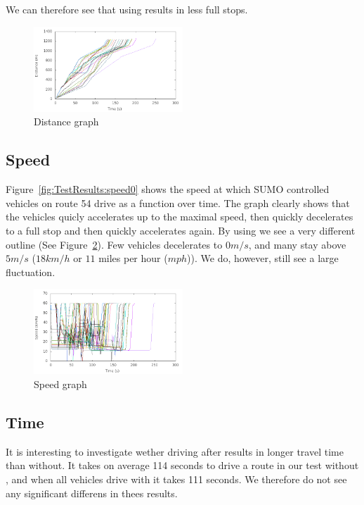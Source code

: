We can therefore see that using \tech results in less full stops.


\begin{figure}[htb]
\includegraphics[width=0.5\textwidth]{images/tp0/distanceControlled100.png}
\caption{Distance graph}
\label{fig:TestResults:distance100}
\end{figure}

\subsection{Speed}
Figure~\ref{fig:TestResults:speed0} shows the speed at which SUMO controlled vehicles on route 54 drive as a function over time.
The graph clearly shows that the vehicles quicly accelerates up to the maximal speed, then quickly decelerates to a full stop and then quickly accelerates again.
By using \tech we see a very different outline (See Figure~\ref{fig:TestResults:speed100}).
Few vehicles decelerates to $0 m/s$, and many stay above $5 m/s$ ($18 km/h$ or $11$ miles per hour ($mph$)).
We do, however, still see a large fluctuation.
\begin{figure}[htb]
\includegraphics[width=0.5\textwidth]{images/tp0/speedControlled100.png}
\caption{Speed graph}
\label{fig:TestResults:speed100}
\end{figure}



\subsection{Time}
It is interesting to investigate wether driving after \tech results in longer travel time than without.
It takes on average 114 seconds to drive a route in our test without \tech, and when all vehicles drive with \tech it takes 111 seconds. 
We therefore do not see any significant differens in thees results.


